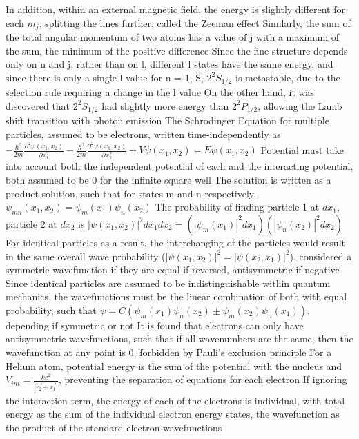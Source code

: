 \documentclass[11 pt, twoside]{article}
\newenvironment{outline*}
{
	\begin{outline}[enumerate]
	}
	{\end{outline}
}
\begin{document}
\begin{outline*}
		\3 In addition, within an external magnetic field, the energy is slightly different for each $m_j$, splitting the lines further, called the Zeeman effect
	\2 Similarly, the sum of the total angular momentum of two atoms has a value of j with a maximum of the sum, the minimum of the positive difference
	\2 Since the fine-structure depends only on n and j, rather than on l, different l states have the same energy, and since there is only a single l value for n = 1, S, $2^2S_{1/2}$ is metastable, due to the selection rule requiring a change in the l value
		\3 On the other hand, it was discovered that $2^2S_{1/2}$ had slightly more energy than $2^2P_{1/2}$, allowing the Lamb shift transition with photon emission
\1 The Schrodinger Equation for multiple particles, assumed to be electrons, written time-independently as $-\frac{\hbar^2}{2m}\frac{\partial^2\psi(x_1, x_2)}{\partial x_1^2} -\frac{\hbar^2}{2m}\frac{\partial^2\psi(x_1, x_2)}{\partial x_2^2} + V\psi(x_1, x_2) = E\psi(x_1, x_2)$
	\2 Potential must take into account both the independent potential of each and the interacting potential, both assumed to be 0 for the infinite square well
	\2 The solution is written as a product solution, such that for states m and n respectively, $\psi_{mn}(x_1, x_2) = \psi_m(x_1)\psi_n(x_2)$
		\3 The probability of finding particle 1 at $dx_1$, particle 2 at $dx_2$ is $|\psi(x_1, x_2)|^2dx_1dx_2 = (|\psi_m(x_1)|^2dx_1)(|\psi_n(x_2)|^2dx_2)$
		\3 For identical particles as a result, the interchanging of the particles would result in the same overall wave probability ($|\psi(x_1, x_2)|^2 = |\psi(x_2, x_1)|^2$), considered a symmetric wavefunction if they are equal if reversed, antisymmetric if negative
	\2 Since identical particles are assumed to be indistinguishable within quantum mechanics, the wavefunctions must be the linear combination of both with equal probability, such that $\psi = C(\psi_m(x_1)\psi_n(x_2) \pm \psi_m(x_2)\psi_n(x_1))$, depending if symmetric or not
	\2 It is found that electrons can only have antisymmetric wavefunctions, such that if all wavenumbers are the same, then the wavefunction at any point is 0, forbidden by Pauli's exclusion principle
\1 For a Helium atom, potential energy is the sum of the potential with the nucleus and $V_{int} = \frac{ke^2}{|\vec{r_2} + \vec{r_1}|}$, preventing the separation of equations for each electron
	\2 If ignoring the interaction term, the energy of each of the electrons is individual, with total energy as the sum of the individual electron energy states, the wavefunction as the product of the standard electron wavefunctions

\end{outline*}
\end{document}
